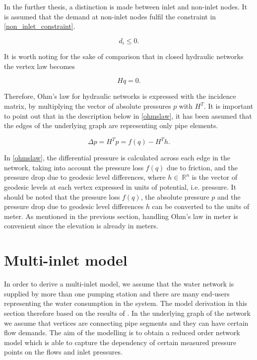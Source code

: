 In the further thesis, a distinction is made between inlet and non-inlet nodes. It is assumed that the demand at non-inlet nodes fulfil the constraint in \eqref{non_inlet_constraint}.

\begin{equation}
  \label{non_inlet_constraint}
  d_i \leq 0.
\end{equation}

It is worth noting for the sake of comparison that in closed hydraulic networks the vertex law becomes

\begin{equation}
  \label{vertexlaw_closed}
  Hq = 0.
\end{equation}

Therefore, Ohm's law for hydraulic networks is expressed with the incidence matrix, by multiplying the vector of absolute pressures $p$ with $H^T$. It is important to point out that in the description below in \eqref{ohmslaw}, it has been assumed that the edges of the underlying graph are representing only pipe elements.

\begin{equation}
  \label{ohmslaw}
  \Delta p = H^Tp = f(q) - H^Th.
\end{equation}

In \eqref{ohmslaw}, the differential pressure is calculated across each edge in the network, taking into account the pressure loss $f(q)$ due to friction, and the pressure drop due to geodesic level differences,  where $h \in \: \mathbb{R}^{n}$ is the vector of geodesic levels at each vertex expressed in units of potential, i.e. pressure. It should be noted that the pressure loss $f(q)$, the absolute pressure $p$  and the pressure drop due to geodesic level differences $h$ can be converted to the units of meter. As mentioned in the previous section, handling Ohm's law in meter is convenient since the elevation is already in meters.

\section{Multi-inlet model}
\label{multi_inlet_reduced_network_description}

In order to derive a multi-inlet model, we assume that the water network is supplied by more than one pumping station and there are many end-users representing the water consumption in the system. The model derivation in this section therefore based on the results of \cite{oneinput_paper}. In the underlying graph of the network we assume that vertices are connecting pipe segments and they can have certain flow demands. The aim of the modelling is to obtain a reduced order network model which is able to capture the dependency of certain measured pressure points on the flows and inlet pressures. 

